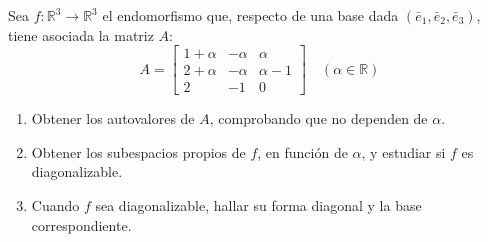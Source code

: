 \begin{enunciado}
 Sea $f: \mathbb{R}^3 \to \mathbb{R}^3$ el endomorfismo que, respecto de una base dada $(\bar{e}_1, \bar{e}_2, \bar{e}_3)$, tiene asociada la matriz $A$:
 \begin{equation*}
  A =
  \begin{bmatrix}
   1+\alpha & -\alpha & \alpha   \\
   2+\alpha & -\alpha & \alpha-1 \\
   2        & -1      & 0
  \end{bmatrix}
  \quad (\alpha \in \mathbb{R})
 \end{equation*}
 \begin{enumerate}[$a$)]
  \item Obtener los autovalores de $A$, comprobando que no dependen de $\alpha$.
  
  \item Obtener los subespacios propios de $f$, en funci\'on de $\alpha$, y estudiar si $f$ es diagonalizable.
  
  \item Cuando $f$ sea diagonalizable, hallar su forma diagonal y la base correspondiente.
 \end{enumerate}
\end{enunciado}
 
